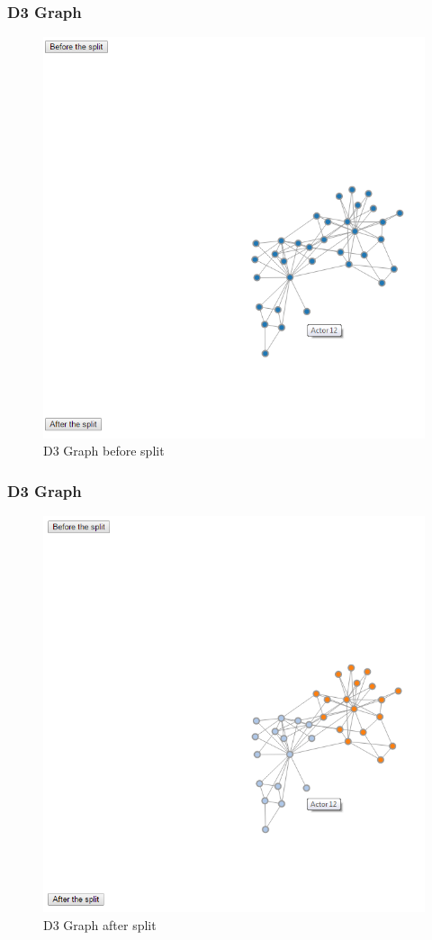 \subsubsection{D3 Graph}
\begin{figure}[ht]    
    \begin{center}
        \includegraphics[scale=0.4]{q3_before.png}
        \caption{D3 Graph before split}
        \label{graph3}
    \end{center}
\end{figure}
\subsubsection{D3 Graph}
\begin{figure}[ht]    
    \begin{center}
        \includegraphics[scale=0.4]{q3_after.png}
        \caption{D3 Graph after split}
        \label{graph4}
    \end{center}
\end{figure}
\newpage


